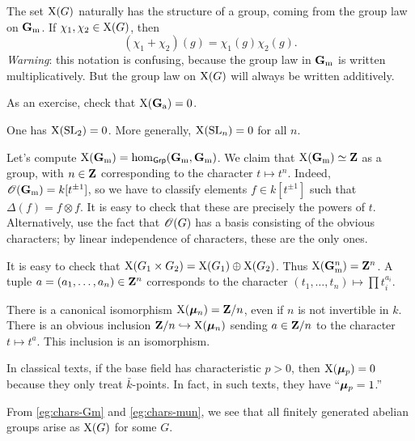 The set $\operatorname{X}(G)$ naturally has the structure of a group, coming from 
the group law on $\mathbf{G}_\mathrm{m}$. If $\chi_1,\chi_2\in \operatorname{X}(G)$, then 
\[
  (\chi_1+\chi_2)(g) = \chi_1(g)\chi_2(g) .
\]
\emph{Warning}: this notation is confusing, because the group law in $\mathbf{G}_\mathrm{m}$ is 
written multiplicatively. But the group law on $\operatorname{X}(G)$ will always be 
written additively. 

\begin{example}
As an exercise, check that $\operatorname{X}(\mathbf{G}_\mathrm{a})=0$. 
\end{example}

\begin{example}
One has $\operatorname{X}(\operatorname{SL}_2)=0$. More generally, $\operatorname{X}(\operatorname{SL}_n)=0$ for all 
$n$. 
\end{example}

\begin{example}\label{eg:chars-Gm}
Let's compute $\operatorname{X}(\mathbf{G}_\mathrm{m})=\hom_{\mathsf{Grp}}(\mathbf{G}_\mathrm{m},\mathbf{G}_\mathrm{m})$. We claim that 
$\operatorname{X}(\mathbf{G}_\mathrm{m})\simeq \mathbf{Z}$ as a group, with $n\in \mathbf{Z}$ corresponding to the 
character $t\mapsto t^n$. Indeed, $\mathscr{O}(\mathbf{G}_\mathrm{m})=k[t^{\pm 1}]$, so we have to 
classify elements $f\in k[t^{\pm 1}]$ such that $\Delta(f)=f\otimes f$. It is 
easy to check that these are precisely the powers of $t$. Alternatively, use 
the fact that $\mathscr{O}(G)$ has a basis consisting of the obvious characters; by 
linear independence of characters, these are the only ones. 
\end{example}

It is easy to check that 
$\operatorname{X}(G_1\times G_2)=\operatorname{X}(G_1)\oplus \operatorname{X}(G_2)$. Thus 
$\operatorname{X}(\mathbf{G}_\mathrm{m}^n) = \mathbf{Z}^n$. A tuple $a=(a_1,\dots,a_n)\in \mathbf{Z}^n$ corresponds 
to the character $(t_1,\dots,t_n)\mapsto \prod t_i^{a_i}$. 

\begin{example}\label{eg:chars-mun}
There is a canonical isomorphism $\operatorname{X}(\bm{\mu}_n)=\mathbf{Z}/n$, even if 
$n$ is not invertible in $k$. There is an obvious inclusion 
$\mathbf{Z}/n\hookrightarrow \operatorname{X}(\bm{\mu}_n)$ sending $a\in \mathbf{Z}/n$ to the character 
$t\mapsto t^a$. This inclusion is an isomorphism. 
\end{example}

In classical texts, if the base field has characteristic $p>0$, then 
$\operatorname{X}(\bm{\mu}_p)=0$ because they only treat $\bar k$-points. In fact, in 
such texts, they have ``$\bm{\mu}_p=1$.'' 

From \autoref{eg:chars-Gm} and \autoref{eg:chars-mun}, we see that all finitely 
generated abelian groups arise as $\operatorname{X}(G)$ for some $G$. 

